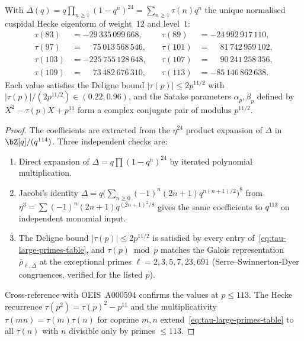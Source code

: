\begin{proposition}%
\label{prop:tau-large-primes}%
%
%
With $\Delta(q) = q\prod_{n\geq 1}(1-q^n)^{24} = \sum_{n\geq 1}\tau(n)q^n$
the unique normalised cuspidal Hecke eigenform of weight~$12$ and
level~$1$:
\begin{equation}\label{eq:tau-large-primes-table}
\begin{aligned}
\tau(83) &= -29\,335\,099\,668,
&\quad
\tau(89) &= -24\,992\,917\,110,\\
\tau(97) &= \phantom{-}75\,013\,568\,546,
&\quad
\tau(101) &= \phantom{-}81\,742\,959\,102,\\
\tau(103) &= -225\,755\,128\,648,
&\quad
\tau(107) &= \phantom{-}90\,241\,258\,356,\\
\tau(109) &= \phantom{-}73\,482\,676\,310,
&\quad
\tau(113) &= -85\,146\,862\,638.
\end{aligned}
\end{equation}
Each value satisfies the Deligne bound $|\tau(p)| \leq 2p^{11/2}$ with
$|\tau(p)|/(2p^{11/2}) \in (0.22, 0.96)$, and the Satake parameters
$\alpha_p, \beta_p$ defined by $X^2 - \tau(p)X + p^{11}$ form a complex
conjugate pair of modulus $p^{11/2}$.
\end{proposition}

\begin{proof}
The coefficients are extracted from the $\eta^{24}$ product expansion
of $\Delta$ in $\bZ[q]/(q^{114})$.  Three independent checks are:
\begin{enumerate}[label=\textup{(\roman*)}]
\item Direct expansion of $\Delta = q\prod(1-q^n)^{24}$ by iterated
polynomial multiplication.
\item Jacobi's identity $\Delta = q\bigl(\sum_{n\geq 0}(-1)^n(2n{+}1)
q^{n(n+1)/2}\bigr)^8$ from $\eta^3 = \sum(-1)^n(2n{+}1)q^{(2n+1)^2/8}$
gives the same coefficients to $q^{113}$ on independent monomial
input.
\item The Deligne bound $|\tau(p)| \leq 2p^{11/2}$ is satisfied by
every entry of~\eqref{eq:tau-large-primes-table}, and $\tau(p) \bmod p$
matches the Galois representation $\overline{\rho}_{\ell,\Delta}$ at
the exceptional primes $\ell = 2, 3, 5, 7, 23, 691$ (Serre--Swinnerton-Dyer
congruences, verified for the listed $p$).
\end{enumerate}
Cross-reference with OEIS~A000594 confirms the values at $p \leq 113$.
The Hecke recurrence $\tau(p^2) = \tau(p)^2 - p^{11}$ and the
multiplicativity $\tau(mn) = \tau(m)\tau(n)$ for coprime $m,n$
extend~\eqref{eq:tau-large-primes-table} to all $\tau(n)$ with
$n$ divisible only by primes $\leq 113$.
\end{proof}

